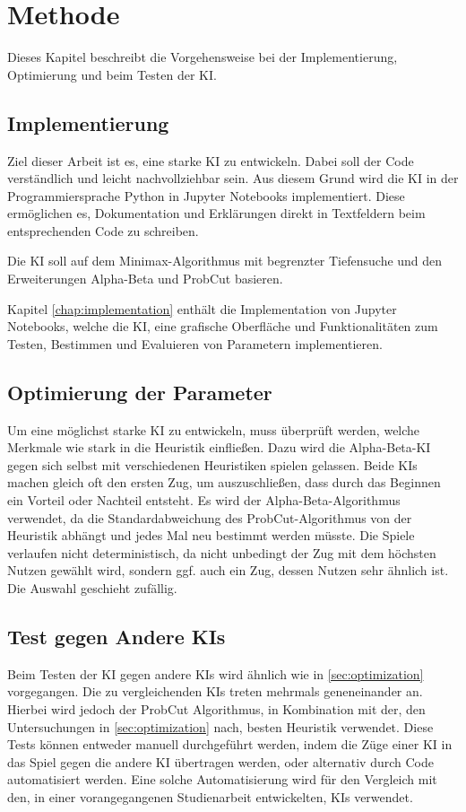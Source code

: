 
\chapter{Methode}
\label{chap:methode}

Dieses Kapitel beschreibt die Vorgehensweise bei der Implementierung, Optimierung und beim Testen der KI.

\section{Implementierung}
Ziel dieser Arbeit ist es, eine starke KI zu entwickeln. Dabei soll der Code verständlich und leicht nachvollziehbar
sein. Aus diesem Grund wird die KI in der Programmiersprache Python in Jupyter Notebooks implementiert. Diese
ermöglichen es, Dokumentation und Erklärungen direkt in Textfeldern beim entsprechenden Code zu schreiben.

Die KI soll auf dem Minimax-Algorithmus mit begrenzter Tiefensuche und den Erweiterungen Alpha-Beta und ProbCut
basieren.

Kapitel \ref{chap:implementation} enthält die Implementation von Jupyter Notebooks, welche die KI, eine grafische
Oberfläche und Funktionalitäten zum Testen, Bestimmen und Evaluieren von Parametern implementieren.

\section{Optimierung der Parameter}
\label{sec:optimization}
Um eine möglichst starke KI zu entwickeln, muss überprüft werden, welche Merkmale wie stark in die Heuristik einfließen.
Dazu wird die Alpha-Beta-KI gegen sich selbst mit verschiedenen Heuristiken spielen gelassen. Beide KIs machen gleich
oft den ersten Zug, um auszuschließen, dass durch das Beginnen ein Vorteil oder Nachteil entsteht. Es wird der
Alpha-Beta-Algorithmus verwendet, da die Standardabweichung des ProbCut-Algorithmus von der Heuristik abhängt und jedes
Mal neu bestimmt werden müsste. Die Spiele verlaufen nicht deterministisch, da nicht unbedingt der Zug mit dem höchsten
Nutzen gewählt wird, sondern ggf. auch ein Zug, dessen Nutzen sehr ähnlich ist. Die Auswahl geschieht zufällig.

\section{Test gegen Andere KIs}
Beim Testen der KI gegen andere KIs wird ähnlich wie in \autoref{sec:optimization} vorgegangen. Die zu vergleichenden
KIs treten mehrmals geneneinander an. Hierbei wird jedoch der ProbCut Algorithmus, in Kombination mit der, den
Untersuchungen in \autoref{sec:optimization} nach, besten Heuristik verwendet. Diese Tests können entweder manuell
durchgeführt werden, indem die Züge einer KI in das Spiel gegen die andere KI übertragen werden, oder alternativ
durch Code automatisiert werden. Eine solche Automatisierung wird für den Vergleich mit den, in einer vorangegangenen
Studienarbeit entwickelten, KIs verwendet.
